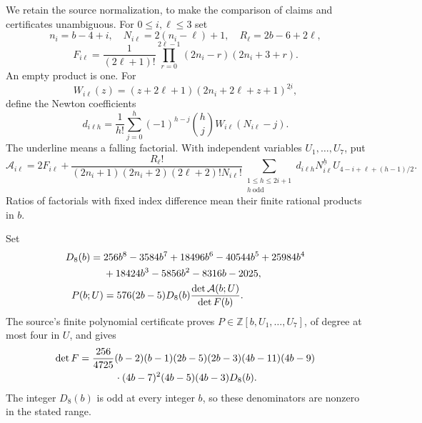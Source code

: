 \documentclass[11pt,a4paper]{article}
\numberwithin{equation}{section}
\theoremstyle{plain}
\theoremstyle{definition}
\theoremstyle{remark}
\begin{document}
We retain the source normalization, to make the comparison of claims
and certificates unambiguous. For $0\le i,\ell\le3$ set
\[
 n_i=b-4+i,\quad N_{i\ell}=2(n_i-\ell)+1,\quad
 R_\ell=2b-6+2\ell,
\]
\[
 F_{i\ell}=\frac1{(2\ell+1)!}
       \prod_{r=0}^{2\ell-1}(2n_i-r)(2n_i+3+r).
\]
An empty product is one. For
\[
 W_{i\ell}(z)=(z+2\ell+1)
                 (2n_i+2\ell+z+1)^{\underline{2i}},
\]
define the Newton coefficients
\begin{equation}\label{r8c:d}
 d_{i\ell h}=\frac1{h!}\sum_{j=0}^{h}
 (-1)^{h-j}\binom hj W_{i\ell}(N_{i\ell}-j).
\end{equation}
The underline means a falling factorial. With independent variables
$U_1,\ldots,U_7$, put
\begin{equation}\label{r8c:smallA}
 \mathcal A_{i\ell}=2F_{i\ell}+
 \frac{R_\ell!}
 {(2n_i+1)(2n_i+2)(2\ell+2)!N_{i\ell}!}
 \sum_{\substack{1\le h\le2i+1\\ h\ \mathrm{odd}}}
 d_{i\ell h}N_{i\ell}^{\underline h}
 U_{4-i+\ell+(h-1)/2}.
\end{equation}
Ratios of factorials with fixed index difference mean their finite
rational products in $b$.

Set
\begin{align}
 D_8(b)={}&256b^8-3584b^7+18496b^6-40544b^5+25984b^4
 \notag\\
 &+18424b^3-5856b^2-8316b-2025,
 \label{r8c:D8}\\
 P(b;U)&=576(2b-5)D_8(b)\frac{\det\mathcal A(b;U)}{\det F(b)}.
 \label{r8c:Pdef}
\end{align}
The source's finite polynomial certificate proves
$P\in\mathbb Z[b,U_1,\ldots,U_7]$, of degree at most four in
$U$, and gives
\begin{align}
 \det F={}&\frac{256}{4725}(b-2)(b-1)(2b-5)(2b-3)
 (4b-11)(4b-9)\notag\\
 &\hspace{8mm}\cdot(4b-7)^2(4b-5)(4b-3)D_8(b).
 \label{r8c:Fdet}
\end{align}
The integer $D_8(b)$ is odd at every integer $b$, so these denominators
are nonzero in the stated range.
\end{document}
